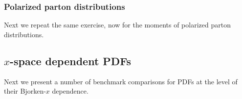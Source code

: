 \subsubsection{Polarized parton distributions}

Next we repeat the same exercise, now for the moments
of polarized parton distributions.

\subsection{$x$-space dependent PDFs}

Next we present a number of benchmark comparisons for
PDFs at the level of their Bjorken-$x$
dependence.
